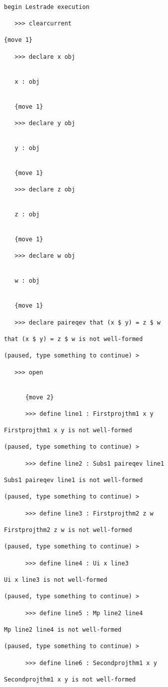 \documentclass[12pt]{article}
\begin{document}
\begin{verbatim}

begin Lestrade execution

   >>> clearcurrent

{move 1}

   >>> declare x obj


   x : obj


   {move 1}

   >>> declare y obj


   y : obj


   {move 1}

   >>> declare z obj


   z : obj


   {move 1}

   >>> declare w obj


   w : obj


   {move 1}

   >>> declare paireqev that (x $ y) = z $ w

that (x $ y) = z $ w is not well-formed

(paused, type something to continue) >

   >>> open


      {move 2}

      >>> define line1 : Firstprojthm1 x y

Firstprojthm1 x y is not well-formed

(paused, type something to continue) >

      >>> define line2 : Subs1 paireqev line1

Subs1 paireqev line1 is not well-formed

(paused, type something to continue) >

      >>> define line3 : Firstprojthm2 z w

Firstprojthm2 z w is not well-formed

(paused, type something to continue) >

      >>> define line4 : Ui x line3

Ui x line3 is not well-formed

(paused, type something to continue) >

      >>> define line5 : Mp line2 line4

Mp line2 line4 is not well-formed

(paused, type something to continue) >

      >>> define line6 : Secondprojthm1 x y

Secondprojthm1 x y is not well-formed


\end{verbatim}
\end{document}
